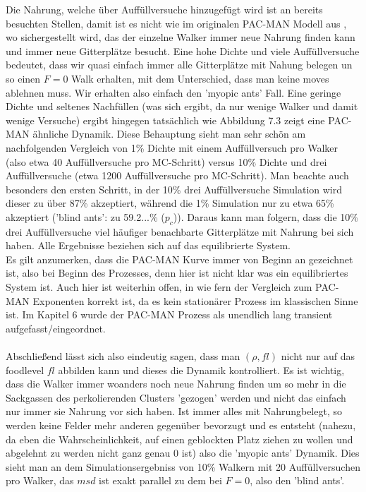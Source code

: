 \documentclass[a4paper, 12pt]{report}
\begin{document}
\noindent Die Nahrung, welche über Auffüllversuche hinzugefügt wird ist an bereits besuchten Stellen, damit ist es nicht wie im originalen PAC-MAN Modell aus \cite{doi:10.1063/1.4999485}, wo sichergestellt wird, das der einzelne Walker immer neue Nahrung finden kann und immer neue Gitterplätze besucht. Eine hohe Dichte und viele Auffüllversuche bedeutet, dass wir quasi einfach immer alle Gitterplätze mit Nahung belegen un so einen $F=0$ Walk erhalten, mit dem Unterschied, dass man keine moves ablehnen muss. Wir erhalten also einfach den 'myopic ants' Fall. Eine geringe Dichte und seltenes Nachfüllen (was sich ergibt, da nur wenige Walker und damit wenige Versuche) ergibt hingegen tatsächlich wie Abbildung 7.3 zeigt eine PAC-MAN ähnliche Dynamik. Diese Behauptung sieht man sehr schön am nachfolgenden Vergleich von 1\% Dichte mit einem Auffüllversuch pro Walker (also etwa 40 Auffüllversuche pro MC-Schritt) versus 10\% Dichte und drei Auffüllversuche (etwa 1200 Auffüllversuche pro MC-Schritt). Man beachte auch besonders den ersten Schritt, in der 10\% drei Auffüllversuche Simulation wird dieser zu über 87\% akzeptiert, während die 1\% Simulation nur zu etwa 65\% akzeptiert ('blind ants': zu 59.2...\% ($p_c$)). Daraus kann man folgern, dass die 10\% drei Auffüllversuche viel häufiger benachbarte Gitterplätze mit Nahrung bei sich haben. Alle Ergebnisse beziehen sich auf das equilibrierte System.
\\
Es gilt anzumerken, dass die PAC-MAN Kurve immer von Beginn an gezeichnet ist, also bei Beginn des Prozesses, denn hier ist nicht klar was ein equilibriertes System ist. Auch hier ist weiterhin offen, in wie fern der Vergleich zum PAC-MAN Exponenten korrekt ist, da es kein stationärer Prozess im klassischen Sinne ist. Im Kapitel 6 wurde der PAC-MAN Prozess als unendlich lang transient aufgefasst/eingeordnet.
\\
\\
Abschließend lässt sich also eindeutig sagen, dass man $(\rho,fl)$ nicht nur auf das foodlevel $fl$ abbilden kann und dieses die Dynamik kontrolliert. Es ist wichtig, dass die Walker immer woanders noch neue Nahrung finden um so mehr in die Sackgassen des perkolierenden Clusters 'gezogen' werden und nicht das einfach nur immer sie Nahrung vor sich haben. Ist immer alles mit Nahrungbelegt, so werden keine Felder mehr anderen gegenüber bevorzugt und es entsteht (nahezu, da eben die Wahrscheinlichkeit, auf einen geblockten Platz ziehen zu wollen und abgelehnt zu werden nicht ganz genau 0 ist) also die 'myopic ants' Dynamik. Dies sieht man an dem Simulationsergebniss von 10\% Walkern mit 20 Auffüllversuchen pro Walker, das $msd$ ist exakt parallel zu dem bei $F=0$, also den 'blind ants'.
\end{document}

